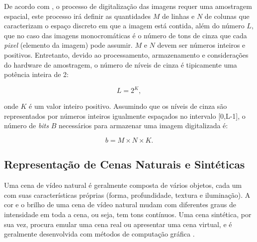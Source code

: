 	De acordo com \cite{gonzalez2004digital}, o processo de digitalização das imagens requer uma amostragem espacial, este processo irá definir as quantidades $M$ de linhas e $N$ de colunas que caracterizam o espaço discreto em que a imagem está contida, além do número $L$, que no caso das imagens monocromáticas é o número de tons de cinza que cada \textit{pixel} (elemento da imagem) pode assumir. $M$ e $N$ devem ser números inteiros e positivos. Entretanto, devido ao processamento, armazenamento e considerações do hardware de amostragem, o número de níveis de cinza é tipicamente uma potência inteira de 2:
\vspace{-1cm}
\begin{center}
	\begin{equation}
		L = 2^K,
	\end{equation}
\end{center}	 
\noindent onde $K$ é um valor inteiro positivo. Assumindo que os níveis de cinza são representados por números inteiros igualmente espaçados no intervalo [0,L-1], o número de \textit{bits} $B$ necessários para armazenar uma imagem digitalizada é:

\begin{equation}
	b = M \times N \times K.
\end{equation}

\subsection{Representação de Cenas Naturais e Sintéticas}

Uma cena de vídeo natural é geralmente composta de vários objetos, cada um com suas características próprias (forma, profundidade, textura e iluminação). A cor e o brilho de uma cena de vídeo natural mudam com diferentes graus de intensidade em toda a cena, ou seja, tem tons contínuos. Uma cena sintética, por sua vez, procura emular uma cena real ou apresentar uma cena virtual, e é geralmente desenvolvida com métodos de computação gráfica \cite{scharstein2002taxonomy}. 

